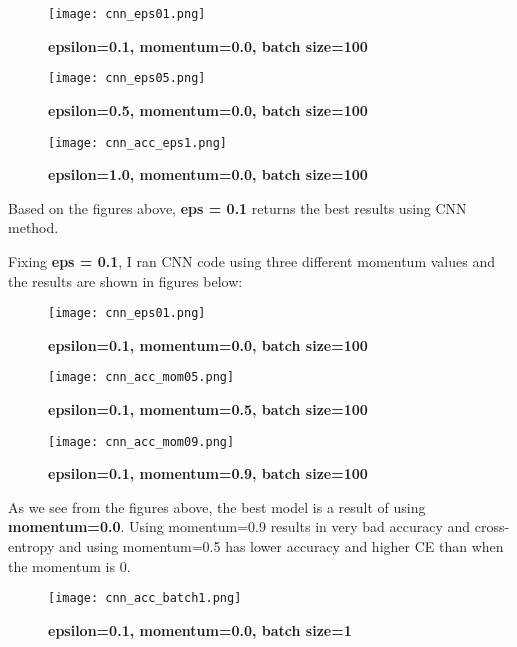 \documentclass[10pt]{article}
\begin{document}
\begin{figure}[H]
	\centering
	\texttt{[image: cnn\_eps01.png]}
	\caption{\textbf{epsilon=0.1, momentum=0.0, batch size=100}}
	\label{fig:}
\end{figure}


\begin{figure}[H]
	\centering
	\texttt{[image: cnn\_eps05.png]}
	\caption{\textbf{epsilon=0.5, momentum=0.0, batch size=100}}
	\label{fig:}
\end{figure}


\begin{figure}[H]
	\centering
	\texttt{[image: cnn\_acc\_eps1.png]}
	\caption{\textbf{epsilon=1.0, momentum=0.0, batch size=100}}
	\label{fig:}
\end{figure}

Based on the figures above, \textbf{eps = 0.1} returns the best results using CNN method.

Fixing \textbf{eps = 0.1}, I ran CNN code using three different momentum values and the results are shown in figures below:

\begin{figure}[H]
	\centering
	\texttt{[image: cnn\_eps01.png]}
	\caption{\textbf{epsilon=0.1, momentum=0.0, batch size=100}}
	\label{fig:}
\end{figure}


\begin{figure}[H]
	\centering
	\texttt{[image: cnn\_acc\_mom05.png]}
	\caption{\textbf{epsilon=0.1, momentum=0.5, batch size=100}}
	\label{fig:}
\end{figure}


\begin{figure}[H]
	\centering
	\texttt{[image: cnn\_acc\_mom09.png]}
	\caption{\textbf{epsilon=0.1, momentum=0.9, batch size=100}}
	\label{fig:}
\end{figure}

As we see from the figures above, the best model is a result of using \textbf{momentum=0.0}. Using momentum=0.9 results in very bad accuracy and cross-entropy and using momentum=0.5 has lower accuracy and higher CE than when the momentum is 0.

\begin{figure}[H]
	\centering
	\texttt{[image: cnn\_acc\_batch1.png]}
	\caption{\textbf{epsilon=0.1, momentum=0.0, batch size=1}}
	\label{fig:}
\end{figure}
\end{document}
